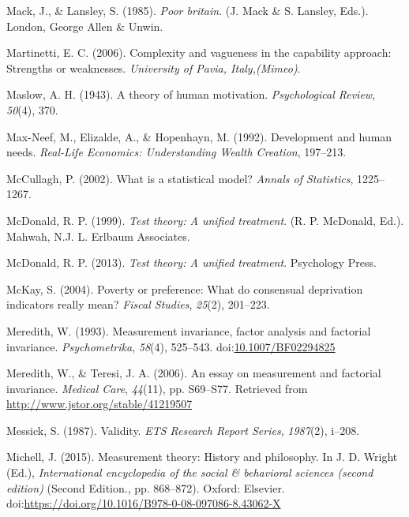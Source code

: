 \documentclass[]{book}
\begin{document}
\leavevmode\hypertarget{ref-Mack1985}{}%
Mack, J., \& Lansley, S. (1985). \emph{Poor britain}. (J. Mack \& S. Lansley, Eds.). London, George Allen \& Unwin.

\leavevmode\hypertarget{ref-Martinetti2006}{}%
Martinetti, E. C. (2006). Complexity and vagueness in the capability approach: Strengths or weaknesses. \emph{University of Pavia, Italy,(Mimeo)}.

\leavevmode\hypertarget{ref-Maslow1943}{}%
Maslow, A. H. (1943). A theory of human motivation. \emph{Psychological Review}, \emph{50}(4), 370.

\leavevmode\hypertarget{ref-Max-Neef1992}{}%
Max-Neef, M., Elizalde, A., \& Hopenhayn, M. (1992). Development and human needs. \emph{Real-Life Economics: Understanding Wealth Creation}, 197--213.

\leavevmode\hypertarget{ref-McCullagh2002}{}%
McCullagh, P. (2002). What is a statistical model? \emph{Annals of Statistics}, 1225--1267.

\leavevmode\hypertarget{ref-McDonald1999}{}%
McDonald, R. P. (1999). \emph{Test theory: A unified treatment}. (R. P. McDonald, Ed.). Mahwah, N.J. L. Erlbaum Associates.

\leavevmode\hypertarget{ref-McDonald2013}{}%
McDonald, R. P. (2013). \emph{Test theory: A unified treatment}. Psychology Press.

\leavevmode\hypertarget{ref-McKay2004}{}%
McKay, S. (2004). Poverty or preference: What do consensual deprivation indicators really mean? \emph{Fiscal Studies}, \emph{25}(2), 201--223.

\leavevmode\hypertarget{ref-Meredith1993}{}%
Meredith, W. (1993). Measurement invariance, factor analysis and factorial invariance. \emph{Psychometrika}, \emph{58}(4), 525--543. doi:\href{https://doi.org/10.1007/BF02294825}{10.1007/BF02294825}

\leavevmode\hypertarget{ref-Meredith2006}{}%
Meredith, W., \& Teresi, J. A. (2006). An essay on measurement and factorial invariance. \emph{Medical Care}, \emph{44}(11), pp. S69--S77. Retrieved from \url{http://www.jstor.org/stable/41219507}

\leavevmode\hypertarget{ref-Messick1987}{}%
Messick, S. (1987). Validity. \emph{ETS Research Report Series}, \emph{1987}(2), i--208.

\leavevmode\hypertarget{ref-Michell2015}{}%
Michell, J. (2015). Measurement theory: History and philosophy. In J. D. Wright (Ed.), \emph{International encyclopedia of the social \& behavioral sciences (second edition)} (Second Edition., pp. 868--872). Oxford: Elsevier. doi:\href{https://doi.org/https://doi.org/10.1016/B978-0-08-097086-8.43062-X}{https://doi.org/10.1016/B978-0-08-097086-8.43062-X}
\end{document}
